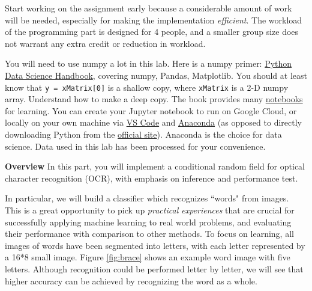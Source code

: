 \documentclass[11pt]{report}
\begin{document}
Start working on the assignment early
because a considerable amount of work will be needed,
especially for making the implementation \emph{efficient}.
%
The workload of the programming part is designed for 4 people, and a smaller group size  does not warrant any extra credit or reduction in workload.

You will need to use numpy a lot in this lab.
Here is a numpy primer: \href{https://jakevdp.github.io/PythonDataScienceHandbook/}{Python Data Science Handbook}, covering numpy, Pandas, Matplotlib.
You should at least know that \texttt{y = xMatrix[0]} is a shallow copy,
where \texttt{xMatrix} is a 2-D numpy array. 
Understand how to make a deep copy.
The book provides many \href{https://github.com/jakevdp/PythonDataScienceHandbook}{notebooks} for learning. 
You can create your Jupyter notebook to run on Google Cloud,
or locally on your own machine via \href{https://code.visualstudio.com/docs/python/python-tutorial}{VS Code} and \href{https://www.anaconda.com/products/individual}{Anaconda} (as opposed to directly downloading Python from the \href{https://www.python.org/downloads/}{official site}).
Anaconda is the choice for data science.
Data used in this lab has been processed for your convenience.


\newpage



{\bf \large Overview}	
In this part, you will implement a conditional random field for optical character recognition (OCR),
with emphasis on inference and performance test.






In particular, we will build a classifier which recognizes ``words" from images.
This is a great opportunity to pick up \emph{practical experiences} that are crucial for successfully applying machine learning to real world problems,
and evaluating their performance with comparison to other methods.
To focus on learning, all images of words have been segmented into letters,
with each letter represented by a 16*8 small image.
Figure \ref{fig:brace} shows an example word image with five letters.
Although recognition could be performed letter by letter,
we will see that higher accuracy can be achieved by recognizing the word as a whole.
\end{document}
